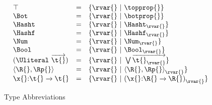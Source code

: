 \begin{figure*}
$$
\begin{array}{lclr}
  \top &=& {\refinenotype {\rvar{}} {\topprop{}}}\\
  \Bot &=& {\refinenotype {\rvar{}} {\botprop{}}}\\
  \Hasht &=& {\refinenotype {\rvar{}} {\isprop {\Hasht} {\rvar{}}}}\\
  \Hashf &=& {\refinenotype {\rvar{}} {\isprop {\Hashf} {\rvar{}}}}\\
  \Num &=& {\refinenotype {\rvar{}} {\isprop {\Num} {\rvar{}}}}\\
  \Bool &=& {\refinenotype {\rvar{}} {\isprop {\Bool} {\rvar{}}}}\\
  {\Unionsplice {\overrightarrow{\t{}}}}
    &=& {\refinenotype {\rvar{}} {\bigvee \overrightarrow{{\isprop {\t{}} {\rvar{}}}}}} \\
  {\Cons {\R{}} {\Rp{}}}
    &=& {\refinenotype {\rvar{}} {\isprop{\Cons {\R{}} {\Rp{}}} {\rvar{}}}}
  \\
                      {\ArrowJustType {\x{}} {\t{}} {\t{}}}
    &=& {\refinenotype {\rvar{}} {\isprop {(\ArrowJustType {\x{}} {\R{}} {\R{}})}{\rvar{}}}}
\end{array}
$$
\caption{Type Abbreviations}
\end{figure*}
